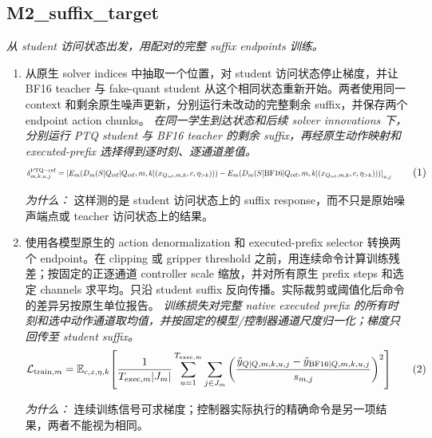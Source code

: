 \documentclass[10pt,a4paper]{article}
\begin{document}
\subsection*{M2\_suffix\_target}
\emph{从 student 访问状态出发，用配对的完整 suffix endpoints 训练。}
\begin{enumerate}[leftmargin=*,start=3]
  \item 从原生 solver indices 中抽取一个位置，对 student 访问状态停止梯度，并让 BF16 teacher 与 fake-quant student 从这个相同状态重新开始。两者使用同一 context 和剩余原生噪声更新，分别运行未改动的完整剩余 suffix，并保存两个 endpoint action chunks。
\noindent\emph{在同一学生到达状态和后续 solver innovations 下，分别运行 PTQ student 与 BF16 teacher 的剩余 suffix，再经原生动作映射和 executed-prefix 选择得到逐时刻、逐通道差值。}
\begin{equation}
\resizebox{\ifdim\width>\linewidth \linewidth\else\width\fi}{!}{$\displaystyle \delta^{\mathrm{PTQ-ref}}_{m,k,u,j}=\left[E_m\!\left(D_m\!\left(S[Q_{\mathrm{ref}}|Q_{\mathrm{ref}},m,k](x_{Q_{\mathrm{ref}},m,k},c,\eta_{>k})\right)\right)-E_m\!\left(D_m\!\left(S[\mathrm{BF16}|Q_{\mathrm{ref}},m,k](x_{Q_{\mathrm{ref}},m,k},c,\eta_{>k})\right)\right)\right]_{u,j}$} \tag{1}
\end{equation}
\par\emph{为什么：} 这样测的是 student 访问状态上的 suffix response，而不只是原始噪声端点或 teacher 访问状态上的结果。
  \item 使用各模型原生的 action denormalization 和 executed-prefix selector 转换两个 endpoint。在 clipping 或 gripper threshold 之前，用连续命令计算训练残差；按固定的正逐通道 controller scale 缩放，并对所有原生 prefix steps 和选定 channels 求平均。只沿 student suffix 反向传播。实际裁剪或阈值化后命令的差异另按原生单位报告。
\noindent\emph{训练损失对完整 native executed prefix 的所有时刻和选中动作通道取均值，并按固定的模型/控制器通道尺度归一化；梯度只回传至 student suffix。}
\begin{equation}
\resizebox{\ifdim\width>\linewidth \linewidth\else\width\fi}{!}{$\displaystyle \mathcal{L}_{\mathrm{train},m}=\mathbb{E}_{c,z,\eta,k}\!\left[\frac{1}{T_{\mathrm{exec},m}|J_m|}\sum_{u=1}^{T_{\mathrm{exec},m}}\sum_{j\in J_m}\left(\frac{\tilde y_{Q|Q,m,k,u,j}-\tilde y_{\mathrm{BF16}|Q,m,k,u,j}}{s_{m,j}}\right)^2\right]$} \tag{2}
\end{equation}
\par\emph{为什么：} 连续训练信号可求梯度；控制器实际执行的精确命令是另一项结果，两者不能视为相同。
\end{enumerate}
\end{document}
